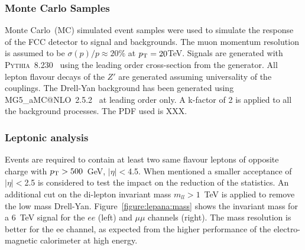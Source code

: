 \subsubsection{Monte Carlo Samples}
\label{subsection:MC}
Monte Carlo~(MC) simulated event samples were used to simulate the response of the FCC detector to signal and backgrounds. The muon momentum resolution 
is assumed to be $\sigma(p)/p \approx 20\%$ at $p_{\text{T}}= 20 $TeV. Signals are generated with {\scshape Pythia}~8.230~\cite{Sjostrand:2014zea} using the leading 
order cross-section from the generator. All lepton flavour decays of the $Z'$ are generated assuming universality of the couplings.
The Drell-Yan background has been generated using {\scshape MG5\_}a{\scshape MC@NLO}~2.5.2~\cite{Alwall:2014hca} at leading order only. 
A k-factor of 2 is applied to all the background processes. The PDF used is XXX.



\subsubsection{Leptonic analysis}
\label{subsection:lepana}

Events are required to contain at least two same flavour leptons of opposite charge with $p_{\text{T}} > 500$~GeV, $|\eta|<$4.5. 
When mentioned a smaller acceptance of $|\eta|<$2.5 is considered to test the impact on the reduction of the statistics. 
An additional cut on the di-lepton invariant mass $m_{ll}>1$~TeV is applied to remove the low mass Drell-Yan. 
Figure~\ref{figure:lepana:mass} shows the invariant mass for a 6~TeV signal for the $ee$ (left) and $\mu\mu$ channels (right). 
The mass resolution is better for the ee channel, as expected from the higher performance of the electro-magnetic calorimeter at high energy.

